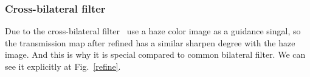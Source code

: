 \documentclass[10pt,twocolumn,letterpaper]{article}
\begin{document}
\subsubsection{Cross-bilateral filter}
\par Due to the cross-bilateral filter~\cite{lv2010real} use a haze color image as a guidance singal, so the transmission map after refined has a similar sharpen degree with the haze image. And this is why it is special compared to common bilateral filter. We can see it explicitly at Fig.~\ref{refine}.
\begin{figure*}[htp]
 \centering{}
 \caption{(a) transmission map. Refinement map with the $\sigma_r$=0.1 (b) bilateral filter, (c) cross-bilateral filter. With the $\sigma_r$=0.3 (d) bilateral filter, (e) cross-bilateral filter} 
\label{refine}
\end{figure*}
 
 
\end{document}
